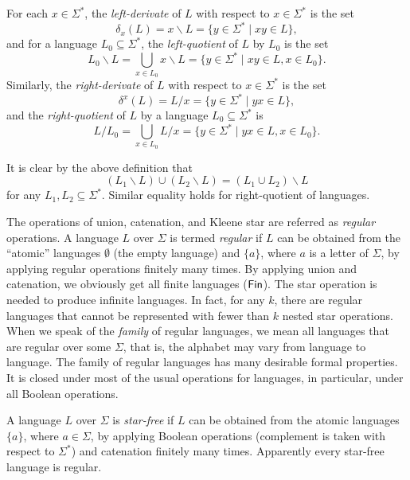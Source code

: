 For each $x \in \Sigma^*$, the \emph{left-derivate} of $L$ with respect to $x \in \Sigma^*$ is the set $$\delta_x(L) = x \backslash L = \{y \in \Sigma^* \mid xy \in L\},$$ and for a language $L_0 \subseteq \Sigma^*$, the \emph{left-quotient} of $L$ by $L_0$ is the set $$L_0 \backslash L = \bigcup_{x \in L_0} x \backslash L = \{y \in \Sigma^* \mid xy \in L, x \in L_0\}.$$ Similarly, the \emph{right-derivate} of $L$ with respect to $x \in \Sigma^*$ is the set $$\delta^x(L) = L / x = \{y \in \Sigma^* \mid yx \in L\},$$ and the \emph{right-quotient} of $L$ by a language $L_0 \subseteq \Sigma^*$ is $$L / L_0 = \bigcup_{x \in L_0} L / x = \{y \in \Sigma^* \mid yx \in L, x \in L_0\}.$$

It is clear by the above definition that $$(L_1 \backslash L) \cup (L_2 \backslash L) = (L_1 \cup L_2) \backslash L$$ for any $L_1, L_2 \subseteq \Sigma^*$. Similar equality holds for right-quotient of languages.

The operations of union, catenation, and Kleene star are referred as \emph{regular} operations. A language $L$ over $\Sigma$ is termed \emph{regular} if $L$ can be obtained from the ``atomic'' languages $\emptyset$ (the  empty language) and $\{a\}$, where $a$ is a letter of $\Sigma$, by applying regular operations finitely many times. By applying union and catenation, we obviously get all finite languages \index{$\Fin$}($\Fin$). The star operation is needed to produce infinite languages. In fact, for any $k$, there are regular languages that cannot be represented with fewer than $k$ nested star operations. When we speak of the \emph{family} of regular languages, we mean all languages that are regular over some $\Sigma$, that is, the alphabet may vary from language to language. The family of regular languages has many desirable formal properties. It is closed under most of the usual operations for languages, in particular, under all Boolean operations.

A language $L$ over $\Sigma$ is \emph{star-free} if $L$ can be obtained from the atomic languages $\{a\}$, where $a \in \Sigma$, by applying Boolean operations (complement is taken with respect to $\Sigma^*$) and catenation finitely many times. Apparently every star-free language is regular.

